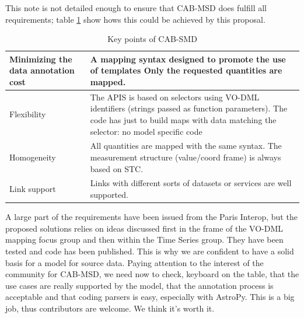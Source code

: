 \documentclass[11pt,a4paper]{ivoa}
\begin{document}
This note is not detailed enough to ensure that  CAB-MSD does fulfill all requirements; table \ref{table:tconclusion} show hows this could be achieved by this proposal.

\begin{table}[!ht]
\begin{tabular}{|p{9em}|p{20em}|}
 \hline
Minimizing the data annotation cost & 
A mapping syntax designed to promote the use of templates
Only the requested quantities are mapped.
\\  
\hline
Flexibility & 
The APIS is based on selectors using VO-DML identifiers (strings passed as function parameters). 
The code has just to build maps with data matching the selector: no model specific code
\\
\hline
Homogeneity & 
All quantities are mapped with the same syntax. The measurement structure (value/coord frame) is always based on STC.
\\  
\hline
Link support &
Links with different sorts of datasets or services are well supported.
\\ 
\hline
\end{tabular}
\caption{Key points of CAB-SMD }
\label{table:tconclusion}
\end{table}

A large part of the requirements have been issued from the Paris Interop, but the proposed solutions relies on ideas discussed first in the frame of the VO-DML mapping focus group and then within the Time Series group. They have been tested and code has been published.
This is why we are confident to have a solid basis for a model for source data. Paying attention to the interest of the community for CAB-MSD, we need now to check, keyboard on the table, that the use cases are really supported by the model, that the annotation process is acceptable and that coding parsers is easy, especially with AstroPy.
This is a big job, thus contributors are welcome. We think it's worth it.

\end{document}
